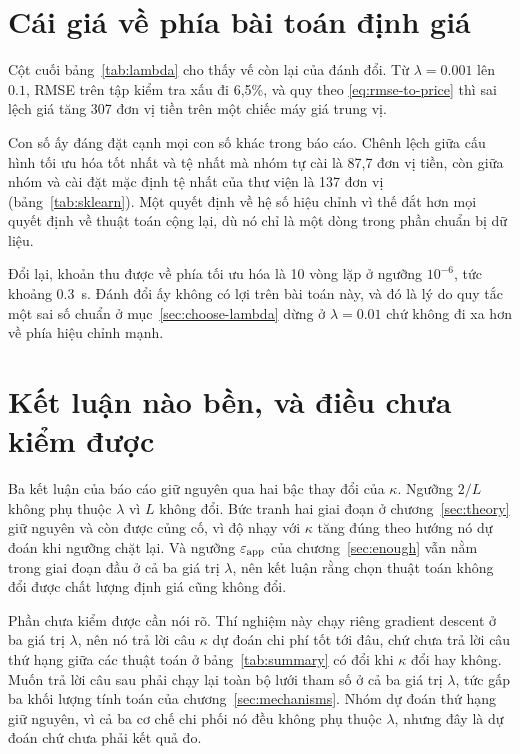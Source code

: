 \section{Cái giá về phía bài toán định giá}
\label{sec:lambda-price}

Cột cuối bảng~\ref{tab:lambda} cho thấy vế còn lại của đánh đổi. Từ
$\lambda = \num{0.001}$ lên $\num{0.1}$, RMSE trên tập kiểm tra xấu đi 6,5\%, và
quy theo \eqref{eq:rmse-to-price} thì sai lệch giá tăng \num{307} đơn vị tiền
trên một chiếc máy giá trung vị.

Con số ấy đáng đặt cạnh mọi con số khác trong báo cáo. Chênh lệch giữa cấu hình
tối ưu hóa tốt nhất và tệ nhất mà nhóm tự cài là 87,7 đơn vị tiền, còn giữa nhóm
và cài đặt mặc định tệ nhất của thư viện là \num{137} đơn vị
(bảng~\ref{tab:sklearn}). Một quyết định về hệ số hiệu chỉnh vì thế đắt hơn mọi
quyết định về thuật toán cộng lại, dù nó chỉ là một dòng trong phần chuẩn bị dữ
liệu.

Đổi lại, khoản thu được về phía tối ưu hóa là 10 vòng lặp ở ngưỡng $10^{-6}$, tức
khoảng \SI{0.3}{\second}. Đánh đổi ấy không có lợi trên bài toán này, và đó là lý
do quy tắc một sai số chuẩn ở mục~\ref{sec:choose-lambda} dừng ở
$\lambda = \num{0.01}$ chứ không đi xa hơn về phía hiệu chỉnh mạnh.

\section{Kết luận nào bền, và điều chưa kiểm được}
\label{sec:lambda-scope}

Ba kết luận của báo cáo giữ nguyên qua hai bậc thay đổi của $\kappa$. Ngưỡng
$2/L$ không phụ thuộc $\lambda$ vì $L$ không đổi. Bức tranh hai giai đoạn ở
chương~\ref{sec:theory} giữ nguyên và còn được củng cố, vì độ nhạy với $\kappa$
tăng đúng theo hướng nó dự đoán khi ngưỡng chặt lại. Và ngưỡng
$\varepsilon_{\text{app}}$ của chương~\ref{sec:enough} vẫn nằm trong giai đoạn đầu ở cả
ba giá trị $\lambda$, nên kết luận rằng chọn thuật toán không đổi được chất lượng
định giá cũng không đổi.

Phần chưa kiểm được cần nói rõ. Thí nghiệm này chạy riêng gradient descent ở ba
giá trị $\lambda$, nên nó trả lời câu $\kappa$ dự đoán chi phí tốt tới đâu, chứ
chưa trả lời câu thứ hạng giữa các thuật toán ở bảng~\ref{tab:summary} có đổi khi
$\kappa$ đổi hay không. Muốn trả lời câu sau phải chạy lại toàn bộ lưới tham số ở
cả ba giá trị $\lambda$, tức gấp ba khối lượng tính toán của
chương~\ref{sec:mechanisms}. Nhóm dự đoán thứ hạng giữ nguyên, vì cả ba cơ chế
chi phối nó đều không phụ thuộc $\lambda$, nhưng đây là dự đoán chứ chưa phải kết
quả đo.
